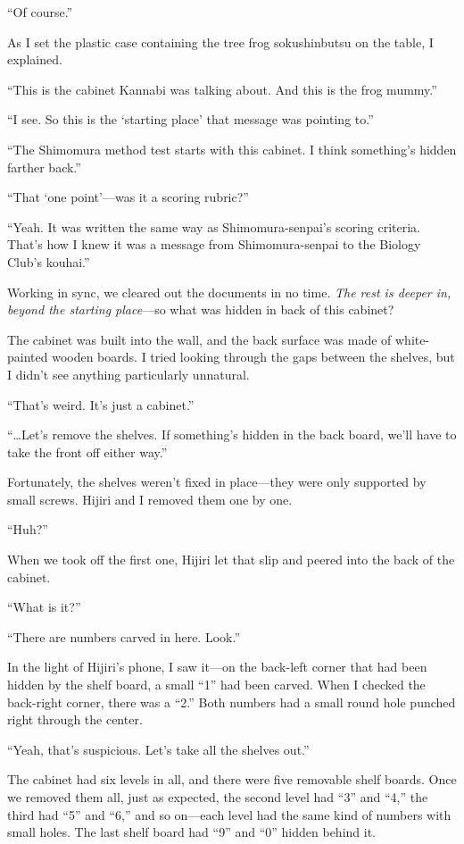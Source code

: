 \documentclass[
    a4paper,
    12pt,
    twoside,
    openany,
    UTF8,
    fontset=windows
]{ctexbook}
\begin{document}
``Of course.''

As I set the plastic case containing the tree frog sokushinbutsu on the table, I explained.

``This is the cabinet Kannabi was talking about. And this is the frog mummy.''

``I see. So this is the `starting place' that message was pointing to.''

``The Shimomura method test starts with this cabinet. I think something's hidden farther back.''

``That `one point'---was it a scoring rubric?''

``Yeah. It was written the same way as Shimomura-senpai's scoring criteria. That's how I knew it was a message from Shimomura-senpai to the Biology Club's kouhai.''

Working in sync, we cleared out the documents in no time.
\textit{The rest is deeper in, beyond the starting place}---so what was hidden in back of this cabinet?

The cabinet was built into the wall, and the back surface was made of white-painted wooden boards. I tried looking through the gaps between the shelves, but I didn't see anything particularly unnatural.

``That's weird. It's just a cabinet.''

``\dots Let's remove the shelves. If something's hidden in the back board, we'll have to take the front off either way.''

Fortunately, the shelves weren't fixed in place---they were only supported by small screws. Hijiri and I removed them one by one.

``Huh?''

When we took off the first one, Hijiri let that slip and peered into the back of the cabinet.

``What is it?''

``There are numbers carved in here. Look.''

In the light of Hijiri's phone, I saw it---on the back-left corner that had been hidden by the shelf board, a small ``1'' had been carved. When I checked the back-right corner, there was a ``2.'' Both numbers had a small round hole punched right through the center.

``Yeah, that's suspicious. Let's take all the shelves out.''

The cabinet had six levels in all, and there were five removable shelf boards. Once we removed them all, just as expected, the second level had ``3'' and ``4,'' the third had ``5'' and ``6,'' and so on---each level had the same kind of numbers with small holes. The last shelf board had ``9'' and ``0'' hidden behind it.
\end{document}
